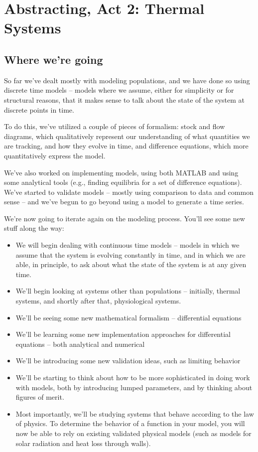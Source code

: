 
\chapter{Abstracting, Act 2: Thermal Systems}

\section{Where we're going}

So far we've dealt mostly with modeling populations, and we have done so using discrete time models -- models where we assume, either for simplicity or for structural reasons, that it makes sense to talk about the state of the system at discrete points in time.  

To do this, we've utilized a couple of pieces of formalism: stock and flow diagrams, which qualitatively represent our understanding of what quantities we are tracking, and how they evolve in time, and difference equations, which more quantitatively express the model. 

We've also worked on implementing models, using both MATLAB and using some analytical tools (e.g., finding equilibria for a set of difference equations). We've started to validate models -- mostly using comparison to data and common sense -- and we've begun to go beyond using a model to generate a time series.

We're now going to iterate again on the modeling process.  You'll see some new stuff along the way:

\begin{itemize}
\item We will begin dealing with continuous time models -- models in which we assume that the system is evolving constantly in time, and in which we are able, in principle, to ask about what the state of the system is at any given time.
\item We'll begin looking at systems other than populations -- initially, thermal systems, and shortly after that, physiological systems.
\item We'll be seeing some new mathematical formalism -- differential equations
\item We'll be learning some new implementation approaches for differential equations -- both analytical and numerical
\item We'll be introducing some new validation ideas, such as limiting behavior
\item We'll be starting to think about how to be more sophisticated in doing work with models, both by introducing lumped parameters, and by thinking about figures of merit.
\item Most importantly, we'll be studying systems that behave according to the law of physics.  To determine the behavior of a function in your model, you will now be able to rely on existing validated physical models (such as models for solar radiation and heat loss through walls). 
\end{itemize}

